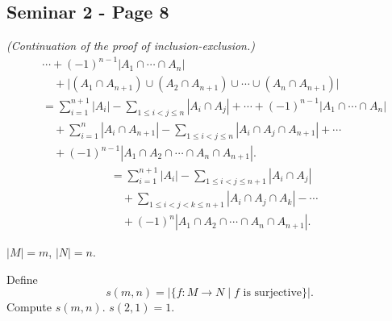 
\subsection*{Seminar 2 - Page 8}

\noindent\textit{(Continuation of the proof of inclusion-exclusion.)}
\[
\begin{aligned}
&\cdots+(-1)^{n-1}\bigl|A_1\cap\cdots\cap A_n\bigr|\\
&\quad+\bigl|(A_1\cap A_{n+1})\cup(A_2\cap A_{n+1})
    \cup\cdots\cup(A_n\cap A_{n+1})\bigr|\\
&=\sum_{i=1}^{n+1}|A_i|
  -\sum_{1\leq i<j\leq n}|A_i\cap A_j|
  +\cdots+(-1)^{n-1}|A_1\cap\cdots\cap A_n|\\
&\quad+\sum_{i=1}^{n}|A_i\cap A_{n+1}|
  -\sum_{1\leq i<j\leq n}|A_i\cap A_j\cap A_{n+1}|
  +\cdots\\
&\quad+(-1)^{n-1}|A_1\cap A_2\cap\cdots\cap A_n\cap A_{n+1}|.
\end{aligned}
\]
\[
\begin{aligned}
&=\sum_{i=1}^{n+1}|A_i|
  -\sum_{1\leq i<j\leq n+1}|A_i\cap A_j|\\
&\quad+\sum_{1\leq i<j<k\leq n+1}|A_i\cap A_j\cap A_k|
  -\cdots\\
&\quad+(-1)^n|A_1\cap A_2\cap\cdots\cap A_n\cap A_{n+1}|.
\end{aligned}
\]

\bigskip
\noindent{}\quad $|M|=m$, $|N|=n$.

\noindent Define
\[
 s(m,n)=\bigl|\{f:M\longrightarrow N\mid f\text{ is surjective}\}\bigr|.
\]
\noindent Compute $s(m,n)$. \hfill $s(2,1)=1$.

